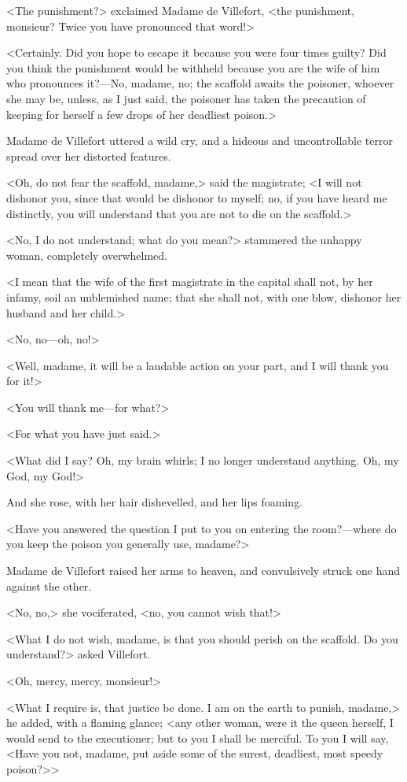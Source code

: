  <The punishment?> exclaimed Madame de Villefort, <the punishment, monsieur? Twice you have pronounced that word!> 

 <Certainly. Did you hope to escape it because you were four times guilty? Did you think the punishment would be withheld because you are the wife of him who pronounces it?—No, madame, no; the scaffold awaits the poisoner, whoever she may be, unless, as I just said, the poisoner has taken the precaution of keeping for herself a few drops of her deadliest poison.> 

 Madame de Villefort uttered a wild cry, and a hideous and uncontrollable terror spread over her distorted features. 

 <Oh, do not fear the scaffold, madame,> said the magistrate; <I will not dishonor you, since that would be dishonor to myself; no, if you have heard me distinctly, you will understand that you are not to die on the scaffold.> 

 <No, I do not understand; what do you mean?> stammered the unhappy woman, completely overwhelmed. 

 <I mean that the wife of the first magistrate in the capital shall not, by her infamy, soil an unblemished name; that she shall not, with one blow, dishonor her husband and her child.> 

 <No, no—oh, no!> 

 <Well, madame, it will be a laudable action on your part, and I will thank you for it!> 

 <You will thank me—for what?> 

 <For what you have just said.> 

 <What did I say? Oh, my brain whirls; I no longer understand anything. Oh, my God, my God!> 

 And she rose, with her hair dishevelled, and her lips foaming. 

 <Have you answered the question I put to you on entering the room?—where do you keep the poison you generally use, madame?> 

 Madame de Villefort raised her arms to heaven, and convulsively struck one hand against the other. 

 <No, no,> she vociferated, <no, you cannot wish that!>

<What I do not wish, madame, is that you should perish on the scaffold. Do you understand?> asked Villefort. 

 <Oh, mercy, mercy, monsieur!> 

 <What I require is, that justice be done. I am on the earth to punish, madame,> he added, with a flaming glance; <any other woman, were it the queen herself, I would send to the executioner; but to you I shall be merciful. To you I will say, <Have you not, madame, put aside some of the surest, deadliest, most speedy poison?>>

